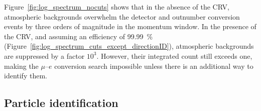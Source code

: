 Figure~\ref{fig:log_spectrum_nocuts} shows that in the absence of the CRV,
atmospheric backgrounds overwhelm the detector and outnumber conversion events
by three orders of magnitude in the momentum window. In the presence of the CRV,
and assuming an efficiency of \SI{99.99}{\percent}
(Figure~\ref{fig:log_spectrum_cuts_except_directionID}), atmospheric backgrounds
are suppressed by a factor $10^3$. However, their integrated count still exceeds
one, making the $\mu$--$e$ conversion search impossible unless there is an
additional way to identify them.










\subsection{Particle identification}


